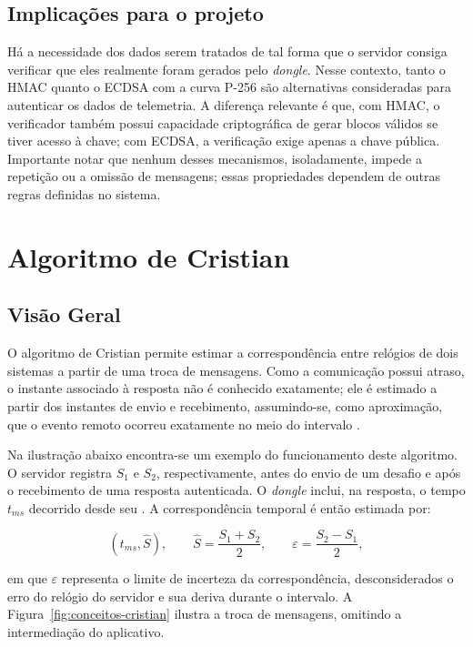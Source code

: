 \subsection{Implicações para o projeto}

Há a necessidade dos dados serem tratados de tal forma que o servidor consiga verificar que eles realmente foram gerados pelo \textit{dongle}. Nesse contexto, tanto o HMAC quanto o ECDSA com a curva P-256 são alternativas consideradas para autenticar os dados de telemetria. A diferença relevante é que, com HMAC, o verificador também possui capacidade criptográfica de gerar blocos válidos se tiver acesso à chave; com ECDSA, a verificação exige apenas a chave pública. Importante notar que nenhum desses mecanismos, isoladamente, impede a repetição ou a omissão de mensagens; essas propriedades dependem de outras regras definidas no sistema.



\section{Algoritmo de Cristian} \label{sec:conceitos-cristian}

\subsection{Visão Geral}

O algoritmo de Cristian permite estimar a correspondência entre relógios de dois sistemas a partir de uma troca de mensagens. Como a comunicação possui atraso, o instante associado à resposta não é conhecido exatamente; ele é estimado a partir dos instantes de envio e recebimento, assumindo-se, como aproximação, que o evento remoto ocorreu exatamente no meio do intervalo \cite{Cristian1989}.

Na ilustração abaixo encontra-se um exemplo do funcionamento deste algoritmo. O servidor registra $S_1$ e $S_2$, respectivamente, antes do envio de um desafio e após o recebimento de uma resposta autenticada. O \textit{dongle} inclui, na resposta, o tempo $t_{ms}$ decorrido desde seu . A correspondência temporal é então estimada por:

\begin{equation}
    (t_{ms},\widehat{S}),\qquad
    \widehat{S}=\frac{S_1+S_2}{2},\qquad
    \varepsilon=\frac{S_2-S_1}{2},
    \label{eq:conceitos-cristian}
\end{equation}

\noindent em que $\varepsilon$ representa o limite de incerteza da correspondência, desconsiderados o erro do relógio do servidor e sua deriva durante o intervalo. A Figura~\ref{fig:conceitos-cristian} ilustra a troca de mensagens, omitindo a intermediação do aplicativo.

